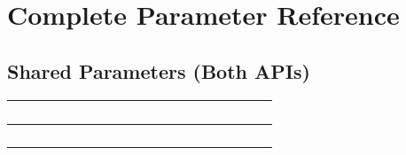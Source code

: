 \documentclass[11pt, a4paper]{article}
\begin{document}
\newpage
\section{Complete Parameter Reference}

\subsection{Shared Parameters (Both APIs)}

{\footnotesize
\begin{longtable}{|L{5.2cm}|C{1.2cm}|C{1.2cm}|L{7cm}|}
\hline
{}
\textcolor{white}{\textbf{Parameter}} & \textcolor{white}{\textbf{Type}} & \textcolor{white}{\textbf{Default}} & \textcolor{white}{\textbf{Description}} \\
\hline
\endfirsthead
\hline
{}
\textcolor{white}{\textbf{Parameter}} & \textcolor{white}{\textbf{Type}} & \textcolor{white}{\textbf{Default}} & \textcolor{white}{\textbf{Description}} \\
\hline
\endhead


\end{longtable}}
\end{document}
